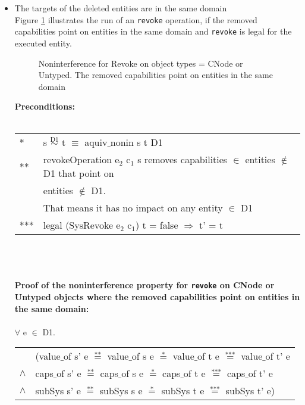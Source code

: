 \begin{itemize}
\item The targets of the deleted entities are in the same domain \\
Figure \ref{fig:RevokeCNode} illustrates the run of an \texttt{revoke} operation, if the removed capabilities point on entities in the same domain and \texttt{revoke} is legal for the executed entity.
\begin{flushleft}
\begin{figure}[H]
\caption{Noninterference for Revoke on object types = CNode or Untyped. The removed capabilities point on entities in the same domain}
\label{fig:RevokeCNode}
\end{figure}
\end{flushleft}
\textbf{Preconditions:} \\ \\
\begin{tabular}{ll}
* & s $\overset{\text{D1}}{\sim}$ t $\equiv$ aquiv$\_$nonin s t D1	\\ 
** & revokeOperation e$_2$ c$_1$ s removes capabilities $\in$ entities $\notin$ D1 that point on \\
& entities $\notin$ D1. \\
& That means it has no impact on any entity $\in$ D1 \\ 
*** & legal (SysRevoke e$_2$ c$_1$) t = false $\Rightarrow$ t' = t
\end{tabular} \\ \\ \\
\textbf{Proof of the noninterference property for \texttt{revoke} on CNode or Untyped objects where the removed capabilities point on entities in the same domain:}\\ \\
$\forall$ e $\in$ D1. \\
\begin{tabular}{ll}
& (value$\_$of s' e $\overset{\text{**}}{=}$ value$\_$of s e $\overset{\text{*}}{=}$ value$\_$of t e $\overset{\text{***}}{=}$ value$\_$of t' e \\
$\wedge$ & caps$\_$of s' e $\overset{\text{**}}{=}$ caps$\_$of s e $\overset{\text{*}}{=}$ caps$\_$of t e $\overset{\text{***}}{=}$ caps$\_$of t' e \\
$\wedge$ & subSys s' e $\overset{\text{**}}{=}$ subSys s e $\overset{\text{*}}{=}$ subSys t e $\overset{\text{***}}{=}$ subSys t' e)
\end{tabular} \\

\end{itemize}
